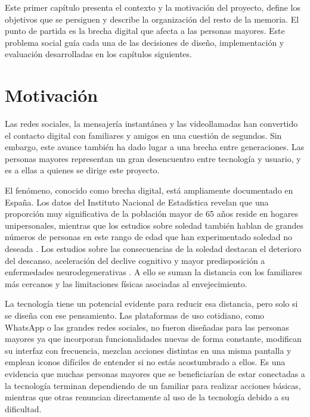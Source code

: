 
Este primer capítulo presenta el contexto y la motivación del proyecto, define
los objetivos que se persiguen y describe la organización del resto de la
memoria. El punto de partida es la brecha digital que afecta a las personas mayores. Este problema social guía cada una de las decisiones de diseño, implementación y evaluación desarrolladas en
los capítulos siguientes.

\section{Motivación\label{SEC:MOTIVACION}}

Las redes sociales, la mensajería instantánea y las
videollamadas han convertido el contacto digital
con familiares y amigos en una cuestión de segundos. Sin embargo, este avance
también ha dado lugar a una brecha entre generaciones. Las personas mayores
representan un gran desencuentro entre
tecnología y usuario, y es a ellas a quienes se dirige este proyecto.

El fenómeno, conocido como brecha digital, está ampliamente documentado en España. Los datos del Instituto Nacional de Estadística revelan que una
proporción muy significativa de la población mayor de 65 años reside en hogares
unipersonales, mientras que los estudios sobre soledad también hablan de grandes números de personas en este rango de edad que han experimentado
soledad no deseada \cite{ine_hogares,rsi_soledad}. Los estudios sobre las consecuencias de la soledad destacan el deterioro del descanso, aceleración del declive
cognitivo y mayor predisposición a enfermedades neurodegenerativas
\cite{soledad_cerebro}. A ello se suman la distancia con los familiares
más cercanos y las limitaciones físicas asociadas al envejecimiento.

La tecnología tiene un potencial evidente para reducir esa distancia, pero solo
si se diseña con ese pensamiento. Las plataformas de uso cotidiano,
como WhatsApp o las grandes redes sociales, no fueron diseñadas para las personas
mayores ya que incorporan funcionalidades nuevas de forma
constante, modifican su interfaz con frecuencia, mezclan acciones distintas en una
misma pantalla y emplean iconos difíciles de entender si no estás acostumbrado a ellos. Es una evidencia que muchas personas mayores que se beneficiarían
de estar conectadas a la tecnología terminan dependiendo de un familiar para realizar acciones
básicas, mientras que otras renuncian directamente al uso de la tecnología debido a su dificultad.

